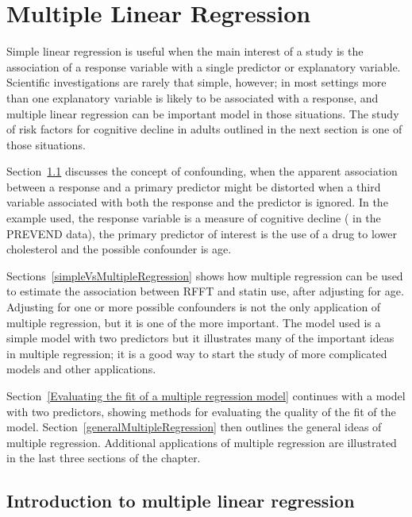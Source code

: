 
\chapter{Multiple Linear Regression}
\label{multipleLinearRegression}



Simple linear regression is useful when the main interest of a study is the association of a response variable with a single predictor or explanatory variable.  Scientific investigations are rarely that simple, however; in most settings more than one explanatory variable is likely to be associated with a response, and multiple linear regression can be important model in those situations.  The study of risk factors for cognitive decline in adults outlined in the next section is one of those situations.

Section~\ref{introductionMultipleLinearRegression} discusses the concept of confounding, when the apparent association between a response and a primary predictor might be distorted when a third variable associated with both the response and the predictor is ignored.  In the example used, the response variable is a measure of cognitive decline ( in the PREVEND data), the primary predictor of interest is the use of a drug to lower cholesterol and the possible confounder is age. 

Sections~\ref{simpleVsMultipleRegression} shows how multiple regression can be used to estimate the association between RFFT and statin use, after adjusting for age.  Adjusting for one or more possible confounders is not the only application of multiple regression, but it is one of the more important.   The model used is a simple model with two predictors but it illustrates many of the important ideas in multiple regression; it is a good way to start the study of more complicated models and other applications.

Section~\ref{Evaluating the fit of a multiple regression model} continues with a model with two predictors, showing methods for evaluating the quality of the fit of the model. Section~\ref{generalMultipleRegression} then outlines the general ideas of multiple regression.  Additional applications of multiple regression are illustrated in the last three sections of the chapter.

\section{Introduction to multiple linear regression}
\label{introductionMultipleLinearRegression}


